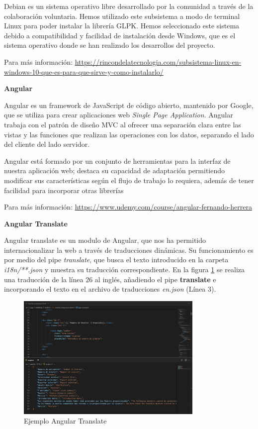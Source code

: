 Debian es un sistema operativo libre desarrollado por la comunidad a través de la colaboración voluntaria. Hemos utilizado este subsistema a modo de terminal Linux para poder instalar la librería GLPK. Hemos seleccionado este sistema debido a compatibilidad  y facilidad de instalación desde Windows, que es el sistema operativo donde se han realizado los desarrollos del proyecto.

Para más información: \url{https://rincondelatecnologia.com/subsistema-linux-en-windows-10-que-es-para-que-sirve-y-como-instalarlo/}


\textbf{Angular}

Angular es un framework de JavaScript de código abierto, mantenido por Google, que se utiliza para  crear aplicaciones web \textit{Single Page Application}. Angular trabaja con el patrón de diseño MVC al ofrecer una separación clara entre las vistas y las funciones que realizan las operaciones con los datos, separando el lado del cliente del lado servidor. 

Angular está formado por un conjunto de herramientas para la interfaz de nuestra aplicación web; destaca su capacidad de adaptación permitiendo modificar sus características según el flujo de trabajo lo requiera, además de tener facilidad para incorporar otras librerías

Para más información: \url{https://www.udemy.com/course/angular-fernando-herrera}

\textbf{Angular Translate}

Angular translate es un modulo de Angular, que nos ha permitido internacionalizar la web a través de traducciones dinámicas. Su funcionamiento es por medio del pipe \textit{translate}, que busca el texto introducido en la carpeta \textit{i18n/**.json} y muestra su traducción correspondiente. En la figura \ref{fig:angular_translate} se realiza una traducción de la línea $26$ al inglés, añadiendo el pipe \textbf{translate} e incorporando el texto en el archivo de traducciones \textit{en.json} (Línea 3).

\begin{figure}[h!] 
\centering
    \includegraphics[width=0.8\textwidth]{img/translate.PNG}
\caption{Ejemplo Angular Translate}
\label{fig:angular_translate}
\end{figure}

